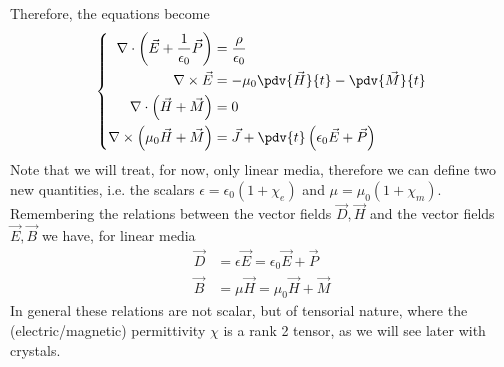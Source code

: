 \documentclass[../electromagnetism.tex]{subfiles}
\begin{document}
Therefore, the equations become
\begin{equation}
	\left\{\begin{aligned}
			\nabla\cdot\left( \vec{E}+\frac{1}{\epsilon_0}\vec{P} \right)&= \frac{\rho}{\epsilon_0}\\
			\nabla\times\vec{E}&= -\mu_0\pdv{\vec{H}}{t}-\pdv{\vec{M}}{t}\\
			\nabla\cdot\left( \vec{H}+\vec{M} \right)&= 0\\
			\nabla\times\left( \mu_0\vec{H}+\vec{M} \right)&= \vec{J}+\pdv{t}\left( \epsilon_0\vec{E}+\vec{P} \right)
	\end{aligned}\right.
	\label{eq:modifiedmw.sol}
\end{equation}
Note that we will treat, for now, only linear media, therefore we can define two new quantities, i.e. the scalars $\epsilon=\epsilon_0(1+\chi_e)$ and $\mu=\mu_0(1+\chi_m)$.\\
Remembering the relations between the vector fields $\vec{D},\vec{H}$ and the vector fields $\vec{E},\vec{B}$ we have, for linear media
\begin{equation}
	\begin{aligned}
		\vec{D}&= \epsilon\vec{E}=\epsilon_0\vec{E}+\vec{P}\\
		\vec{B}&= \mu\vec{H}=\mu_0\vec{H}+\vec{M}
	\end{aligned}
	\label{eq:bhedrel.sol}
\end{equation}
In general these relations are not scalar, but of tensorial nature, where the (electric/magnetic) permittivity $\chi$ is a rank 2 tensor, as we will see later with crystals.
\end{document}

